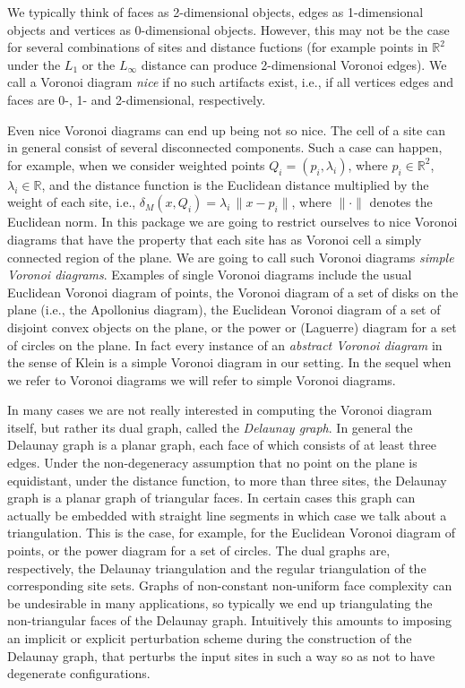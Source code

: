 We typically think of faces as 2-dimensional objects, edges as
1-dimensional objects and vertices as 0-dimensional objects. However,
this may not be the case for several combinations of sites and
distance fuctions (for example points in $\mathbb{R}^2$ under the
$L_1$ or the $L_\infty$ distance can produce 2-dimensional Voronoi
edges). We call a Voronoi diagram \emph{nice} if no such artifacts
exist, i.e., if all vertices edges and faces are 0-, 1- and
2-dimensional, respectively.

Even nice Voronoi diagrams can end up being not so nice. The cell of a
site can in general consist of several disconnected components. Such a
case can happen, for example, when we consider weighted points
$Q_i=(p_i,\lambda_i)$, where $p_i\in\mathbb{R}^2$,
$\lambda_i\in\mathbb{R}$, and the distance function is 
the Euclidean distance multiplied by the weight of each site, i.e.,
$\delta_M(x,Q_i)=\lambda_i\,\|x-p_i\|$, where $\|\cdot\|$ denotes the
Euclidean norm. In this package we are going to restrict ourselves to
nice Voronoi diagrams that have the property that each site has as
Voronoi cell a simply connected region of the plane. We are going to
call such Voronoi diagrams \emph{simple Voronoi diagrams}. Examples of
single Voronoi diagrams include the usual Euclidean Voronoi diagram of
points, the Voronoi diagram of a set of disks on the plane (i.e., the
Apollonius diagram), the Euclidean Voronoi diagram of a set of
disjoint convex objects on the plane, or the power or (Laguerre)
diagram for a set of circles on the plane. In fact every instance of
an \emph{abstract Voronoi diagram} in the sense of Klein \cite{} is a
simple Voronoi diagram in our setting. In the sequel when we refer to
Voronoi diagrams we will refer to simple Voronoi diagrams.

In many cases we are not really interested in computing the
Voronoi diagram itself, but rather its dual graph, called the
\emph{Delaunay graph}. In general the Delaunay graph is a planar
graph, each face of which consists of at least three edges.
Under the non-degeneracy assumption that no point on the plane is
equidistant, under the distance function, to more than three sites, 
the Delaunay graph is a planar graph of triangular faces.
In certain cases this graph can actually be embedded with straight
line segments in which case we talk about a triangulation. This is the
case, for example, for the Euclidean Voronoi diagram of points, or the
power diagram for a set of circles. The dual graphs are, respectively,
the Delaunay triangulation and the regular triangulation of the
corresponding site sets. Graphs of non-constant non-uniform face
complexity can be undesirable in many applications, so typically we
end up triangulating the non-triangular faces of the Delaunay
graph. Intuitively this amounts to imposing an implicit or explicit
perturbation scheme during the construction of the Delaunay graph,
that perturbs the input sites in such a way so as not to have
degenerate configurations.

